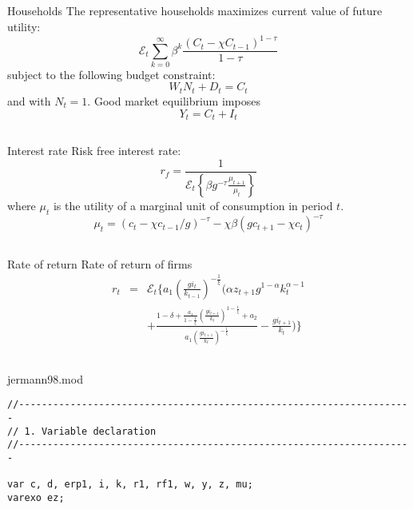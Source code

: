 \documentclass{beamer}
\begin{document}
\subsection[]{}
\begin{slide}{Households}
The representative households maximizes current value of future utility:
\[
{\mathcal E}_t \sum_{k=0}^\infty\beta^k\frac{\left(C_t-\chi C_{t-1}\right)^{1-\tau}}{1-\tau}
\]
subject to the following budget constraint:
\[
W_tN_t+D_t = C_t
\]
and with $N_t=1$.
Good market equilibrium imposes
\[
Y_t = C_t+I_t
\]
\end{slide}

\subsection[]{}
\begin{slide}{Interest rate}
Risk free interest rate:
\[
r_f = \frac{1}{{\mathcal E}_t\left\{\beta g^{-\tau}\frac{\mu_{t+1}}{\mu_t}\right\}}
\]
where $\mu_t$ is the utility of a marginal unit of consumption in period $t$.
\[
\mu_t = \left(c_t-\chi c_{t-1}/g\right)^{-\tau}-\chi \beta\left(g c_{t+1}-\chi c_t\right)^{-\tau}
\]
\end{slide}

\subsection[]{}
\begin{slide}{Rate of return}
Rate of return of firms
\begin{eqnarray*}
r_t  &=& {\mathcal E}_t\Bigg\{a_1\left(\frac{g i_t}{k_{t-1}}\right)^{-\frac{1}{\xi}}\Bigg(\alpha z_{t+1}g^{1-\alpha}k_t^{\alpha-1}\\
&&+\frac{1-\delta+\frac{a_1}{1-\frac{1}{\xi}}\left(\frac{g i_{t+1}}{k_t}\right)^{1-\frac{1}{\xi}}+a_2}{a_1\left(\frac{g i_{t+1}}{k_t}\right)^{-\frac{1}{\xi}}}-\frac{g i_{t+1}}{k_t}\Bigg)\Bigg\}
\end{eqnarray*}
\end{slide}

\subsection[]{}
\begin{slide}{jermann98.mod}
{\tiny\begin{verbatim}
//---------------------------------------------------------------------
// 1. Variable declaration
//---------------------------------------------------------------------

var c, d, erp1, i, k, r1, rf1, w, y, z, mu; 
varexo ez;                          

\end{verbatim}
 } 
\end{slide}
\end{document}
